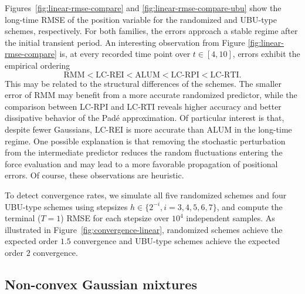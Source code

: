 \documentclass[12pt]{article}
\numberwithin{equation}{section}
\begin{document}

Figures~\ref{fig:linear-rmse-compare} and \ref{fig:linear-rmse-compare-ubu} show the long-time RMSE of the position variable for the randomized and UBU-type schemes, respectively. For both families, the errors approach a stable regime after the initial transient period.
An interesting observation from Figure \ref{fig:linear-rmse-compare} is, at every recorded time point over $t\in[4,10]$, errors exhibit the empirical ordering
\[
\text{RMM}<\text{LC-REI}<\text{ALUM}<\text{LC-RPI}<\text{LC-RTI}.
\]
This may be related to the structural differences of the schemes. The smaller error of RMM may benefit from a more accurate randomized predictor, while the comparison between LC-RPI and LC-RTI reveals higher accuracy and better dissipative behavior of the Pad\'e approximation. 
%
Of particular interest is that, despite fewer Gaussians, LC-REI is more accurate than ALUM in the long-time regime. One possible explanation is that removing the stochastic perturbation from the intermediate predictor reduces the random fluctuations entering the force evaluation and may lead to a more favorable propagation of positional errors. Of course, these observations are heuristic.

To detect convergence rates, we simulate all five randomized schemes and four UBU-type schemes using stepsizes $h \in \{2^{-i}, i=3,4,5,6,7\}$, and compute the terminal ($T=1$) RMSE for each stepsize over $10^4$ independent samples. As illustrated in Figure~\ref{fig:convergence-linear}, randomized schemes achieve the expected order $1.5$ convergence and UBU-type schemes achieve the expected order $2$ convergence.


\subsection{Non-convex Gaussian mixtures}
\label{subsec:experiment-mixture}
\end{document}
